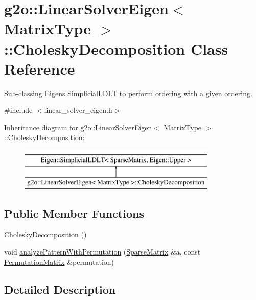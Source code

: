 \hypertarget{classg2o_1_1_linear_solver_eigen_1_1_cholesky_decomposition}{}\section{g2o\+:\+:Linear\+Solver\+Eigen$<$ Matrix\+Type $>$\+:\+:Cholesky\+Decomposition Class Reference}
\label{classg2o_1_1_linear_solver_eigen_1_1_cholesky_decomposition}


Sub-\/classing Eigen\textquotesingle{}s Simplicial\+L\+D\+LT to perform ordering with a given ordering.  




{\ttfamily \#include $<$linear\+\_\+solver\+\_\+eigen.\+h$>$}

Inheritance diagram for g2o\+:\+:Linear\+Solver\+Eigen$<$ Matrix\+Type $>$\+:\+:Cholesky\+Decomposition\+:\begin{figure}[H]
\begin{center}
\leavevmode
\includegraphics[height=2.000000cm]{classg2o_1_1_linear_solver_eigen_1_1_cholesky_decomposition}
\end{center}
\end{figure}
\subsection*{Public Member Functions}
\begin{DoxyCompactItemize}
\item 
\mbox{\hyperlink{classg2o_1_1_linear_solver_eigen_1_1_cholesky_decomposition_a4c82911542773cdcd66b470edb21831e}{Cholesky\+Decomposition}} ()
\item 
void \mbox{\hyperlink{classg2o_1_1_linear_solver_eigen_1_1_cholesky_decomposition_a3aa432f9aec0b7230c733df9a4d80558}{analyze\+Pattern\+With\+Permutation}} (\mbox{\hyperlink{classg2o_1_1_linear_solver_eigen_aeb7e2400bed3a249b5f29ce7cc00cd33}{Sparse\+Matrix}} \&a, const \mbox{\hyperlink{classg2o_1_1_linear_solver_eigen_acd9dd4e15dfbbad2720f1b83519333e8}{Permutation\+Matrix}} \&permutation)
\end{DoxyCompactItemize}


\subsection{Detailed Description}
